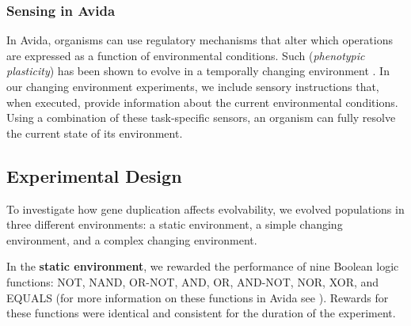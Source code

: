 \subsubsection{Sensing in Avida}
In Avida, organisms can use regulatory mechanisms that alter which operations are expressed as a function of environmental conditions.  Such (\textit{phenotypic plasticity}) has been shown to evolve in a temporally changing environment
\citep{Clune:2007investigating, Lalejini:2016plasticity}. In our changing environment experiments, we include sensory instructions that, when executed, provide %
information about the current environmental conditions.
Using a combination of these task-specific sensors, an organism can fully resolve the current state of its environment. %

\subsection{Experimental Design}
To investigate how gene duplication affects evolvability, we evolved populations in three different environments: a static environment, a simple changing environment, and a complex changing environment.

In the \textbf{static environment}, we rewarded the performance of nine Boolean logic functions: NOT, NAND, OR-NOT, AND, OR, AND-NOT, NOR, XOR, and EQUALS (for more information on these functions in Avida see \citep{lenski2003evolutionary}). %
Rewards for these functions were identical and consistent for the duration of the experiment.

